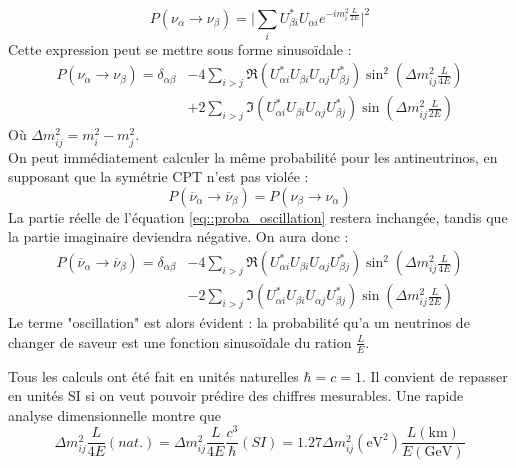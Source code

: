             \begin{equation*}
                P(\nu_{\alpha}\to\nu_{\beta}) = \bigg|\sum_i U_{\beta i}^*U_{\alpha i} e^{-im_i^2\frac{L}{2E}}\bigg|^2
            \end{equation*}
            Cette expression peut se mettre sous forme sinusoïdale\cite{Mondal2015} :
            \begin{equation}\label{eq::proba_oscillation}
                \begin{split}
                    P(\nu_{\alpha}\to\nu_{\beta}) = \delta_{\alpha\beta} & - 4\sum_{i>j}\Re(U_{\alpha i}^*U_{\beta i}U_{\alpha j}U_{\beta j}^*)\sin^2\left(\Delta m_{ij}^2\frac{L}{4E}\right) \\
                    & +2\sum_{i>j}\Im(U_{\alpha i}^*U_{\beta i}U_{\alpha j}U_{\beta j}^*)\sin\left(\Delta m_{ij}^2\frac{L}{2E}\right)
                \end{split}
            \end{equation}
            Où $\Delta m_{ij}^2 = m_i^2-m_j^2$.\\
            On peut immédiatement calculer la même probabilité pour les antineutrinos, en supposant que la symétrie CPT n'est pas violée : 
            \begin{equation}
                P(\overline{\nu}_{\alpha}\to\overline{\nu}_{\beta}) = P(\nu_{\beta}\to\nu_{\alpha})
            \end{equation}
            La partie réelle de l'équation \eqref{eq::proba_oscillation} restera inchangée, tandis que la partie imaginaire deviendra négative. On aura donc :
            \begin{equation}
                \begin{split}
                    P(\overline{\nu}_{\alpha}\to\overline{\nu}_{\beta}) = \delta_{\alpha\beta} & - 4\sum_{i>j}\Re(U_{\alpha i}^*U_{\beta i}U_{\alpha j}U_{\beta j}^*)\sin^2\left(\Delta m_{ij}^2\frac{L}{4E}\right) \\
                    & -2\sum_{i>j}\Im(U_{\alpha i}^*U_{\beta i}U_{\alpha j}U_{\beta j}^*)\sin\left(\Delta m_{ij}^2\frac{L}{2E}\right)
                \end{split}
            \end{equation}
            Le terme "oscillation" est alors évident : la probabilité qu'a un neutrinos de changer de saveur est une fonction sinusoïdale du ration $\frac{L}{E}$. 
            
            Tous les calculs ont été fait en unités naturelles $\hbar = c = 1$. Il convient de repasser en unités SI si on veut pouvoir prédire des chiffres mesurables. Une rapide analyse dimensionnelle montre que 
            \begin{equation}
                \Delta m_{ij}^2\frac{L}{4E}(nat.)
                =\Delta m_{ij}^2\frac{L}{4E}\frac{c^3}{\hbar}(SI)
                =1.27\Delta m_{ij}^2(\si{\electronvolt\squared})\frac{L(\si{\kilo\meter})}{E(\si{\giga\electronvolt})}
            \end{equation}
            
